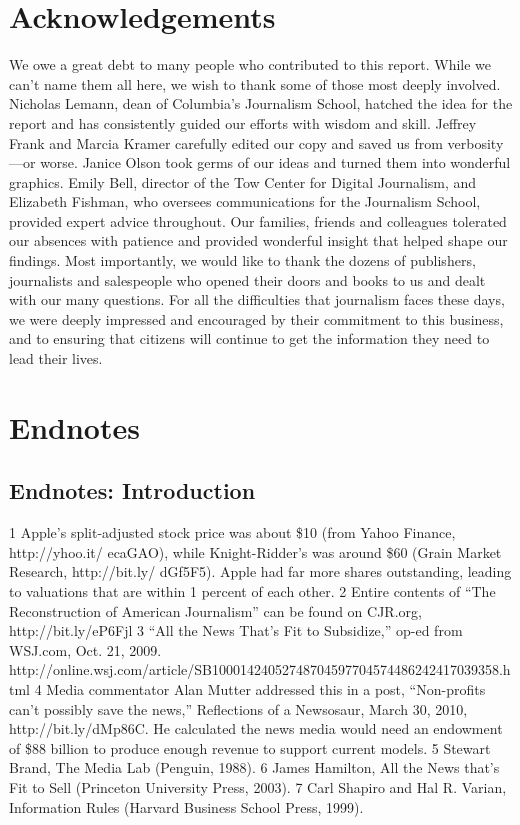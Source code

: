 \chapter{Acknowledgements}
We owe a great debt to many people who contributed to this report. While we
can't name them all here, we wish to thank some of those most deeply involved.
Nicholas Lemann, dean of Columbia's Journalism School, hatched the idea
for the report and has consistently guided our efforts with wisdom and skill.
Jeffrey Frank and Marcia Kramer carefully edited our copy and saved us from
verbosity—or worse. Janice Olson took germs of our ideas and turned them into
wonderful graphics. Emily Bell, director of the Tow Center for Digital Journalism,
and Elizabeth Fishman, who oversees communications for the Journalism
School, provided expert advice throughout.
Our families, friends and colleagues tolerated our absences with patience and
provided wonderful insight that helped shape our findings.
Most importantly, we would like to thank the dozens of publishers, journalists
and salespeople who opened their doors and books to us and dealt with our
many questions. For all the difficulties that journalism faces these days, we were
deeply impressed and encouraged by their commitment to this business, and to
ensuring that citizens will continue to get the information they need to lead
their lives.

\chapter{Endnotes}
\section{Endnotes: Introduction}
1 Apple's split-adjusted stock price was about \$10 (from Yahoo Finance, http://yhoo.it/
ecaGAO), while Knight-Ridder's was around \$60 (Grain Market Research, http://bit.ly/
dGf5F5). Apple had far more shares outstanding, leading to valuations that are within 1 percent
of each other.
2 Entire contents of “The Reconstruction of American Journalism” can be found on CJR.org,
http://bit.ly/eP6Fjl
3 “All the News That's Fit to Subsidize,” op-ed from WSJ.com, Oct. 21, 2009.
http://online.wsj.com/article/SB10001424052748704597704574486242417039358.html
4 Media commentator Alan Mutter addressed this in a post, “Non-profits can't possibly save the
news,” Reflections of a Newsosaur, March 30, 2010, http://bit.ly/dMp86C. He calculated the
news media would need an endowment of \$88 billion to produce enough revenue to support
current models.
5 Stewart Brand, The Media Lab (Penguin, 1988).
6 James Hamilton, All the News that's Fit to Sell (Princeton University Press, 2003).
7 Carl Shapiro and Hal R. Varian, Information Rules (Harvard Business School Press, 1999).


